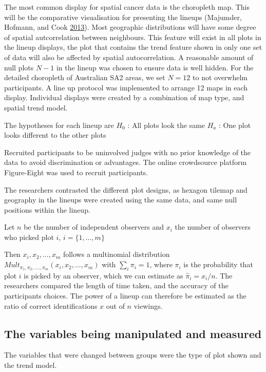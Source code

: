 \documentclass[conference,final,]{IEEEtran}
\begin{document}
The most common display for spatial cancer data is the choropleth map.
This will be the comparative visualisation for presenting the lineups
(Majumder, Hofmann, and Cook \protect\hyperlink{ref-VVSIALM}{2013}).
Most geographic distributions will have some degree of spatial
autcorrelation between neighbours. This feature will exist in all plots
in the lineup displays, the plot that contains the trend feature shown
in only one set of data will also be affected by spatial
autocorrelation. A reasonable amount of null plots \(N-1\) in the lineup
was chosen to ensure data is well hidden. For the detailed choropleth of
Australian SA2 areas, we set \(N = 12\) to not overwhelm participants. A
line up protocol was implemented to arrange 12 maps in each display.
Individual displays were created by a combination of map type, and
spatial trend model.

The hypotheses for each lineup are \(H_0\) : All plots look the same
\(H_a\) : One plot looks different to the other plots

Recruited participants to be uninvolved judges with no prior knowledge
of the data to avoid discrimination or advantages. The online
crowdsource platform Figure-Eight was used to recruit participants.

The researchers contrasted the different plot designs, as hexagon
tilemap and geography in the lineups were created using the same data,
and same null positions within the lineup.

Let \(n\) be the number of independent observers and \(x_i\) the number
of observers who picked plot \(i\), \(i = \{1,...,m\}\)

Then \(x_i, x_2, ..., x_m\) follows a multinomial
distribution\(Mult_{\pi_1, \pi_2, ...., \pi_m}(x_i, x_2, ..., x_m)\)
with \(\sum_i \pi_i = 1\), where \(\pi_i\) is the probability that plot
\(i\) is picked by an observer, which we can estimate as
\(\hat{\pi}_i = x_i/n\). The researchers compared the length of time
taken, and the accuracy of the participants choices. The power of a
lineup can therefore be estimated as the ratio of correct
identifications \(x\) out of \(n\) viewings.

\hypertarget{the-variables-being-manipulated-and-measured}{%
\subsection{The variables being manipulated and
measured}\label{the-variables-being-manipulated-and-measured}}

The variables that were changed between groups were the type of plot
shown and the trend model.
\end{document}
